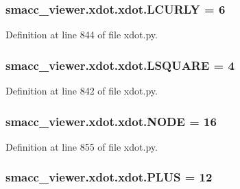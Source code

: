 \subsubsection[{\texorpdfstring{L\+C\+U\+R\+LY}{LCURLY}}]{ smacc\+\_\+viewer.\+xdot.\+xdot.\+L\+C\+U\+R\+LY = 6}\hypertarget{namespacesmacc__viewer_1_1xdot_1_1xdot_adac1d0e0bcfd0d606455d14b3a6bf493}{}\label{namespacesmacc__viewer_1_1xdot_1_1xdot_adac1d0e0bcfd0d606455d14b3a6bf493}


Definition at line 844 of file xdot.\+py.

\subsubsection[{\texorpdfstring{L\+S\+Q\+U\+A\+RE}{LSQUARE}}]{ smacc\+\_\+viewer.\+xdot.\+xdot.\+L\+S\+Q\+U\+A\+RE = 4}\hypertarget{namespacesmacc__viewer_1_1xdot_1_1xdot_a2b49cb9b27785695ca3a4c26204d4464}{}\label{namespacesmacc__viewer_1_1xdot_1_1xdot_a2b49cb9b27785695ca3a4c26204d4464}


Definition at line 842 of file xdot.\+py.

\subsubsection[{\texorpdfstring{N\+O\+DE}{NODE}}]{ smacc\+\_\+viewer.\+xdot.\+xdot.\+N\+O\+DE = 16}\hypertarget{namespacesmacc__viewer_1_1xdot_1_1xdot_aa7766c9761e801932bd793b2d5db8679}{}\label{namespacesmacc__viewer_1_1xdot_1_1xdot_aa7766c9761e801932bd793b2d5db8679}


Definition at line 855 of file xdot.\+py.

\subsubsection[{\texorpdfstring{P\+L\+US}{PLUS}}]{ smacc\+\_\+viewer.\+xdot.\+xdot.\+P\+L\+US = 12}\hypertarget{namespacesmacc__viewer_1_1xdot_1_1xdot_a4564805f61cd78209c24d173b7265d42}{}\label{namespacesmacc__viewer_1_1xdot_1_1xdot_a4564805f61cd78209c24d173b7265d42}


